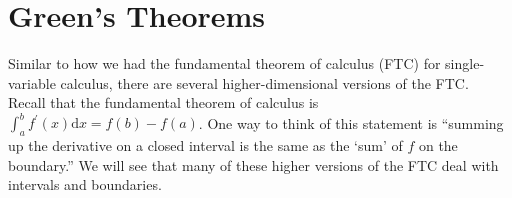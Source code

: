 \section{Green's Theorems}
\noindent
Similar to how we had the fundamental theorem of calculus (FTC) for single-variable calculus, there are several higher-dimensional versions of the FTC.\\
Recall that the fundamental theorem of calculus is $\int_{a}^{b}{f^\prime(x)\mathrm{d}x}=f(b)-f(a)$. One way to think of this statement is “summing up the derivative on a closed interval is the same as the ‘sum’ of $f$ on the boundary.” We will see that many of these higher versions of the FTC deal with intervals and boundaries.


